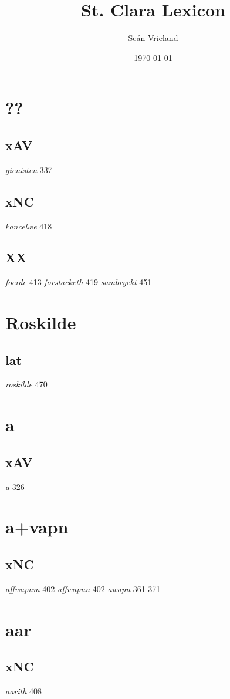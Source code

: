 \documentclass[a4paper,twocolumn]{article}
\author{Seán Vrieland}
\date{\today}
\title{St. Clara Lexicon}
\renewcommand\maketitle{}
\begin{document}
\maketitle
\section{??}
\label{sec:orgd4631b0}
\subsection{xAV}
\label{sec:org77b8ace}
\emph{gienisten} 337 
\subsection{xNC}
\label{sec:org1cd83bf}
\emph{kancelæe} 418 
\subsection{XX}
\label{sec:org03e0519}
\emph{foerde} 413 \emph{forstacketh} 419 \emph{sambryckt} 451 
\section{Roskilde}
\label{sec:org4992751}
\subsection{lat}
\label{sec:orge6bb252}
\emph{roskilde} 470 
\section{a}
\label{sec:org70e2e79}
\subsection{xAV}
\label{sec:orgc526512}
\emph{a} 326 
\section{a+vapn}
\label{sec:orga8e31dd}
\subsection{xNC}
\label{sec:org0f69ded}
\emph{affwapnm} 402 \emph{affwapnn} 402 \emph{awapn} 361 371 
\section{aar}
\label{sec:orga998cf3}
\subsection{xNC}
\label{sec:org49438b5}
\emph{aarith} 408 
\end{document}
